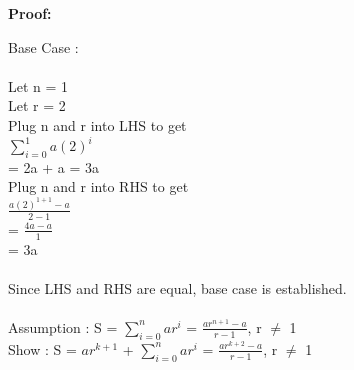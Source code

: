 \documentclass[12pt]{article}
\begin{document}
\par
\bigskip
{\bf Proof:}
\par
Base Case : \\
\\
	Let n = 1 \\
	Let r = 2 \\
	Plug n and r into LHS to get \\
	$\sum\limits_{i = 0}^1 a(2)^{i}$ \\
	= 2a + a = 3a \\
	Plug n and r into RHS to get \\
	$\frac{a(2)^{1+1} - a}{2 - 1}$ \\
	= $\frac{4a - a}{1}$ \\
	= 3a \\
	\\
Since LHS and RHS are equal, base case is established. \\
\\

Assumption : S = $\sum\limits_{i = 0}^n ar^{i}$ = $\frac{ar^{n+1} - a}{r - 1}$, r $\neq$ 1 \\
Show : S = $ar^{k + 1}$ + $\sum\limits_{i = 0}^n ar^{i}$ = $\frac{ar^{k+2} - a}{r - 1}$, r $\neq$ 1 \\
\end{document}
